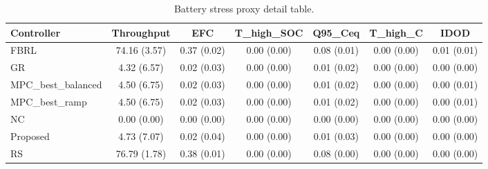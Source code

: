 \begin{table}[t]
\centering
\caption{Battery stress proxy detail table.}
\label{tab:stress_proxy_auto}
\begin{tabular}{lcccccc}
\toprule
Controller & Throughput & EFC & T\_high\_SOC & Q95\_Ceq & T\_high\_C & IDOD \\
\midrule
FBRL & 74.16 (3.57) & 0.37 (0.02) & 0.00 (0.00) & 0.08 (0.01) & 0.00 (0.00) & 0.01 (0.01) \\
GR & 4.32 (6.57) & 0.02 (0.03) & 0.00 (0.00) & 0.01 (0.02) & 0.00 (0.00) & 0.00 (0.00) \\
MPC\_best\_balanced & 4.50 (6.75) & 0.02 (0.03) & 0.00 (0.00) & 0.01 (0.02) & 0.00 (0.00) & 0.00 (0.01) \\
MPC\_best\_ramp & 4.50 (6.75) & 0.02 (0.03) & 0.00 (0.00) & 0.01 (0.02) & 0.00 (0.00) & 0.00 (0.01) \\
NC & 0.00 (0.00) & 0.00 (0.00) & 0.00 (0.00) & 0.00 (0.00) & 0.00 (0.00) & 0.00 (0.00) \\
Proposed & 4.73 (7.07) & 0.02 (0.04) & 0.00 (0.00) & 0.01 (0.03) & 0.00 (0.00) & 0.00 (0.00) \\
RS & 76.79 (1.78) & 0.38 (0.01) & 0.00 (0.00) & 0.08 (0.00) & 0.00 (0.00) & 0.00 (0.00) \\
\bottomrule
\end{tabular}
\end{table}
